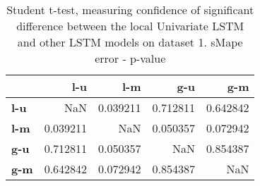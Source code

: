 \begin{table}[h]
\centering
\caption{Student t-test, measuring confidence of significant difference between the local Univariate LSTM and other LSTM models on dataset 1. sMape error - p-value}
\label{table:ttest-p-values-lstm-experiments-sMAPE-dataset-1}
\begin{tabular}{lrrrr}
\toprule
{} &       l-u &       l-m &       g-u &       g-m \\
\midrule
\textbf{l-u} &       NaN &  0.039211 &  0.712811 &  0.642842 \\
\textbf{l-m} &  0.039211 &       NaN &  0.050357 &  0.072942 \\
\textbf{g-u} &  0.712811 &  0.050357 &       NaN &  0.854387 \\
\textbf{g-m} &  0.642842 &  0.072942 &  0.854387 &       NaN \\
\bottomrule
\end{tabular}
\end{table}
